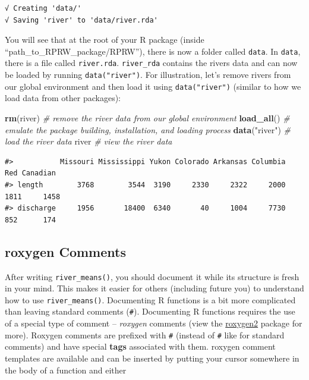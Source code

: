 \documentclass[
]{book}
\newenvironment{Shaded}{\begin{snugshade}}{\end{snugshade}}
\newcommand{\CommentTok}[1]{\textcolor[rgb]{0.56,0.35,0.01}{\textit{#1}}}
\newcommand{\KeywordTok}[1]{\textcolor[rgb]{0.13,0.29,0.53}{\textbf{#1}}}
\newcommand{\NormalTok}[1]{#1}
\newcommand{\StringTok}[1]{\textcolor[rgb]{0.31,0.60,0.02}{#1}}
\begin{document}
\begin{verbatim}
√ Creating 'data/'
√ Saving 'river' to 'data/river.rda'
\end{verbatim}

You will see that at the root of your R package (inside ``path\_to\_RPRW\_package/RPRW''), there is now a folder called \texttt{data}. In \texttt{data}, there is a file called \texttt{river.rda}. \texttt{river\_rda} contains the rivers data and can now be loaded by running \texttt{data("river")}. For illustration, let's remove rivers from our global environment and then load it using \texttt{data("river")} (similar to how we load data from other packages):

\begin{Shaded}
\begin{Highlighting}[]
\KeywordTok{rm}\NormalTok{(river) }\CommentTok{# remove the river data from our global environment}
\KeywordTok{load_all}\NormalTok{() }\CommentTok{# emulate the package building, installation, and loading process}
\KeywordTok{data}\NormalTok{(}\StringTok{"river"}\NormalTok{) }\CommentTok{# load the river data}
\NormalTok{river }\CommentTok{# view the river data}
\end{Highlighting}
\end{Shaded}

\begin{verbatim}
#>           Missouri Mississippi Yukon Colorado Arkansas Columbia  Red Canadian
#> length        3768        3544  3190     2330     2322     2000 1811     1458
#> discharge     1956       18400  6340       40     1004     7730  852      174
\end{verbatim}

\hypertarget{roxygen}{%
\subsection{roxygen Comments}\label{roxygen}}

After writing \texttt{river\_means()}, you should document it while its structure is fresh in your mind. This makes it easier for others (including future you) to understand how to use \texttt{river\_means()}. Documenting R functions is a bit more complicated than leaving standard comments (\texttt{\#}). Documenting R functions requires the use of a special type of comment -- \emph{roxygen} comments (view the \href{https://roxygen2.r-lib.org/}{roxygen2} package for more). Roxygen comments are prefixed with \texttt{\#\textquotesingle{}} (instead of \texttt{\#} like for standard comments) and have special \textbf{tags} associated with them. roxygen comment templates are available and can be inserted by putting your cursor somewhere in the body of a function and either
\end{document}

